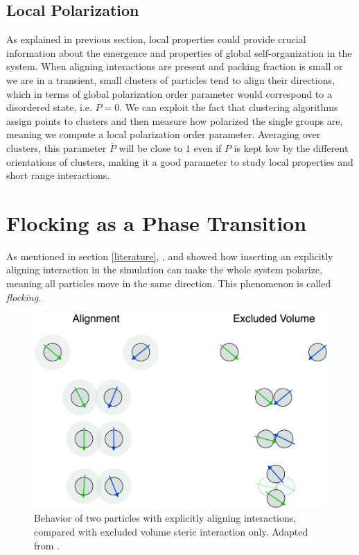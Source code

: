 \documentclass[../../master_thesis_np.tex]{subfiles}
\begin{document}
		\subsection{Local Polarization}
		As explained in previous section, local properties could provide crucial information about the emergence and properties of global self-organization in the system. 
		When aligning interactions are present and packing fraction is small or we are in a transient, small clusters of particles tend to align their directions, which in terms of global polarization order parameter would correspond to a disordered state, i.e. $P = 0$. 
		We can exploit the fact that clustering algorithms assign points to clusters and then measure how polarized the single groups are, meaning we compute a local polarization order parameter. 
		Averaging over clusters, this parameter $\bar{P}$ will be close to $1$ even if $P$ is kept low by the different orientations of clusters, making it a good parameter to study local properties and short range interactions.
		
		\section{Flocking as a Phase Transition} \label{phasetrans}
		As mentioned in section \ref{literature}, \citeauthor{martin-gomez_collective_2018}, and \citeauthor{negi_emergent_2022} \cite{martin-gomez_collective_2018, negi_emergent_2022} showed how inserting an explicitly aligning interaction in the simulation can make the whole system polarize, meaning all particles move in the same direction. 
		This phenomenon is called \emph{flocking}.
		
		\begin{figure}[htp]
			\centering
			\includegraphics[width=\textwidth]{alignment.png}
			\caption{Behavior of two particles with explicitly aligning interactions, compared with excluded volume steric interaction only. Adapted from \cite{martin-gomez_collective_2018}.}
			\label{fig:alignment}
		\end{figure}
		
\end{document}
